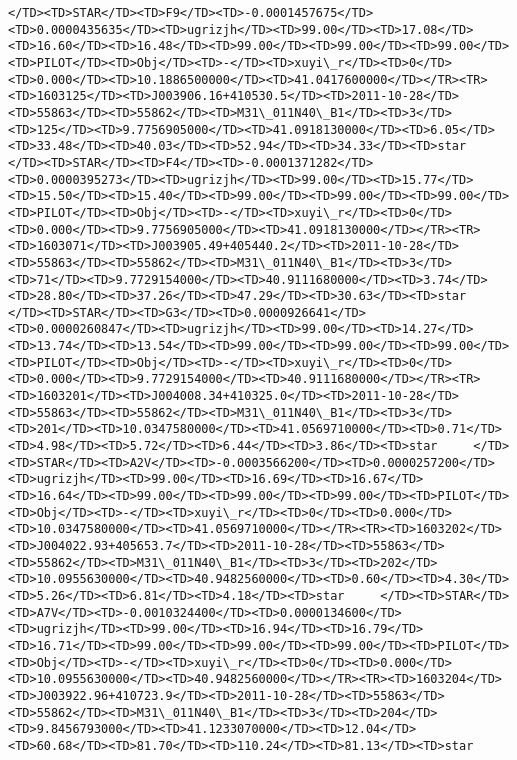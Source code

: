 \documentclass[11pt]{article}
\begin{document}
\begin{Verbatim}[commandchars=\\\{\}]
</TD><TD>STAR</TD><TD>F9</TD><TD>-0.0001457675</TD><TD>0.0000435635</TD><TD>ugrizjh</TD><TD>99.00</TD><TD>17.08</TD><TD>16.60</TD><TD>16.48</TD><TD>99.00</TD><TD>99.00</TD><TD>99.00</TD><TD>PILOT</TD><TD>Obj</TD><TD>-</TD><TD>xuyi\_r</TD><TD>0</TD><TD>0.000</TD><TD>10.1886500000</TD><TD>41.0417600000</TD></TR><TR><TD>1603125</TD><TD>J003906.16+410530.5</TD><TD>2011-10-28</TD><TD>55863</TD><TD>55862</TD><TD>M31\_011N40\_B1</TD><TD>3</TD><TD>125</TD><TD>9.7756905000</TD><TD>41.0918130000</TD><TD>6.05</TD><TD>33.48</TD><TD>40.03</TD><TD>52.94</TD><TD>34.33</TD><TD>star     </TD><TD>STAR</TD><TD>F4</TD><TD>-0.0001371282</TD><TD>0.0000395273</TD><TD>ugrizjh</TD><TD>99.00</TD><TD>15.77</TD><TD>15.50</TD><TD>15.40</TD><TD>99.00</TD><TD>99.00</TD><TD>99.00</TD><TD>PILOT</TD><TD>Obj</TD><TD>-</TD><TD>xuyi\_r</TD><TD>0</TD><TD>0.000</TD><TD>9.7756905000</TD><TD>41.0918130000</TD></TR><TR><TD>1603071</TD><TD>J003905.49+405440.2</TD><TD>2011-10-28</TD><TD>55863</TD><TD>55862</TD><TD>M31\_011N40\_B1</TD><TD>3</TD><TD>71</TD><TD>9.7729154000</TD><TD>40.9111680000</TD><TD>3.74</TD><TD>28.80</TD><TD>37.26</TD><TD>47.29</TD><TD>30.63</TD><TD>star     </TD><TD>STAR</TD><TD>G3</TD><TD>0.0000926641</TD><TD>0.0000260847</TD><TD>ugrizjh</TD><TD>99.00</TD><TD>14.27</TD><TD>13.74</TD><TD>13.54</TD><TD>99.00</TD><TD>99.00</TD><TD>99.00</TD><TD>PILOT</TD><TD>Obj</TD><TD>-</TD><TD>xuyi\_r</TD><TD>0</TD><TD>0.000</TD><TD>9.7729154000</TD><TD>40.9111680000</TD></TR><TR><TD>1603201</TD><TD>J004008.34+410325.0</TD><TD>2011-10-28</TD><TD>55863</TD><TD>55862</TD><TD>M31\_011N40\_B1</TD><TD>3</TD><TD>201</TD><TD>10.0347580000</TD><TD>41.0569710000</TD><TD>0.71</TD><TD>4.98</TD><TD>5.72</TD><TD>6.44</TD><TD>3.86</TD><TD>star     </TD><TD>STAR</TD><TD>A2V</TD><TD>-0.0003566200</TD><TD>0.0000257200</TD><TD>ugrizjh</TD><TD>99.00</TD><TD>16.69</TD><TD>16.67</TD><TD>16.64</TD><TD>99.00</TD><TD>99.00</TD><TD>99.00</TD><TD>PILOT</TD><TD>Obj</TD><TD>-</TD><TD>xuyi\_r</TD><TD>0</TD><TD>0.000</TD><TD>10.0347580000</TD><TD>41.0569710000</TD></TR><TR><TD>1603202</TD><TD>J004022.93+405653.7</TD><TD>2011-10-28</TD><TD>55863</TD><TD>55862</TD><TD>M31\_011N40\_B1</TD><TD>3</TD><TD>202</TD><TD>10.0955630000</TD><TD>40.9482560000</TD><TD>0.60</TD><TD>4.30</TD><TD>5.26</TD><TD>6.81</TD><TD>4.18</TD><TD>star     </TD><TD>STAR</TD><TD>A7V</TD><TD>-0.0010324400</TD><TD>0.0000134600</TD><TD>ugrizjh</TD><TD>99.00</TD><TD>16.94</TD><TD>16.79</TD><TD>16.71</TD><TD>99.00</TD><TD>99.00</TD><TD>99.00</TD><TD>PILOT</TD><TD>Obj</TD><TD>-</TD><TD>xuyi\_r</TD><TD>0</TD><TD>0.000</TD><TD>10.0955630000</TD><TD>40.9482560000</TD></TR><TR><TD>1603204</TD><TD>J003922.96+410723.9</TD><TD>2011-10-28</TD><TD>55863</TD><TD>55862</TD><TD>M31\_011N40\_B1</TD><TD>3</TD><TD>204</TD><TD>9.8456793000</TD><TD>41.1233070000</TD><TD>12.04</TD><TD>60.68</TD><TD>81.70</TD><TD>110.24</TD><TD>81.13</TD><TD>star     
\end{Verbatim}
\end{document}

